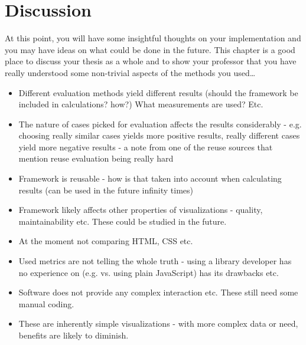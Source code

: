 
\chapter{Discussion}
\label{chapter:discussion}

At this point, you will have some insightful thoughts on your implementation
and you may have ideas on what could be done in the future. 
This chapter is a good place to discuss your thesis as a whole and to show your
professor that you have really understood some non-trivial aspects of the
methods you used\ldots

\begin{itemize}
	\item Different evaluation methods yield different results (should the framework be included in calculations? how?) What measurements are used? Etc.
	\item The nature of cases picked for evaluation affects the results considerably - e.g. choosing really similar cases yields more positive results, really different cases yield more negative results - a note from one of the reuse sources that mention reuse evaluation being really hard
	\item Framework is reusable - how is that taken into account when calculating results (can be used in the future infinity times)
	\item Framework likely affects other properties of visualizations - quality, maintainability etc. These could be studied in the future.
	\item At the moment not comparing HTML, CSS etc.
	\item Used metrics are not telling the whole truth - using a library developer has no experience on (e.g. vs. using plain JavaScript) has its drawbacks etc.
	\item Software does not provide any complex interaction etc. These still need some manual coding.
	\item These are inherently simple visualizations - with more complex data or need, benefits are likely to diminish.
\end{itemize}
